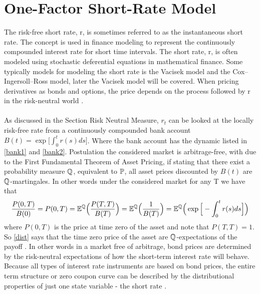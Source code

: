 \section{One-Factor Short-Rate Model}
The risk-free short rate, r, is sometimes referred to as the instantaneous short rate. 
The concept is used in finance modeling to represent the continuously compounded interest rate for 
short time intervals. The short rate, r, is often modeled using stochastic deferential equations in 
mathematical finance. Some typically models for modeling the short rate is the Vacisek model and the Cox–Ingersoll–Ross model, 
later the Vacisek model will be covered. When pricing derivatives as bonds and options, the price depends on 
the process followed by r in the risk-neutral world \cite{Hull}.
\\\\
As discussed in the Section Risk Neutral Measure, $r_t$ can be looked at the locally risk-free 
rate from a continuously compounded bank account $B(t)= \exp \Big[\int_{0}^{t} r(s) ds \Big]$. 
Where the bank account has the dynamic listed in \autoref{bank1} and \autoref{bank2}.
Postulation the considered market is arbitrage-free, with due to the First Fundamental Theorem of Asset Pricing, 
if stating that there exist a probability measure $\mathbb{Q}$, equivalent to $\mathbb{P}$, all asset prices discounted by $B(t)$
are $\mathbb{Q}$-martingales. In other words under the considered market for any T we have that 
\begin{align}
    \frac{P(0,T)}{B(0)} = P(0,T) = \mathbb{E}^{\mathbb{Q}} \Big( \frac{P(T,T)}{B(T)}\Big) = \mathbb{E}^{\mathbb{Q}} \Big( \frac{1}{B(T)}\Big) 
    = \mathbb{E}^{\mathbb{Q}} \Big( \exp \Big[ - \int_{0}^{t}r(s)ds \Big] \Big)
    \label{dist}
\end{align}
where $P(0,T)$ is the price at time zero of the asset and note that $P(T,T)=1$. So \autoref{dist} says that 
the time zero price of the asset are $\mathbb{Q}$-expectations  of the payoff \cite{Bermudan}.
In other words in a market free of arbitrage, bond prices are determined by the risk-neutral expectations 
of how the short-term interest rate will behave. Because all types of interest rate instruments are based
on bond prices, the entire term structure or zero coupon curve can be described by the distributional properties
of just one state variable - the short rate \cite{Bermudan}.

